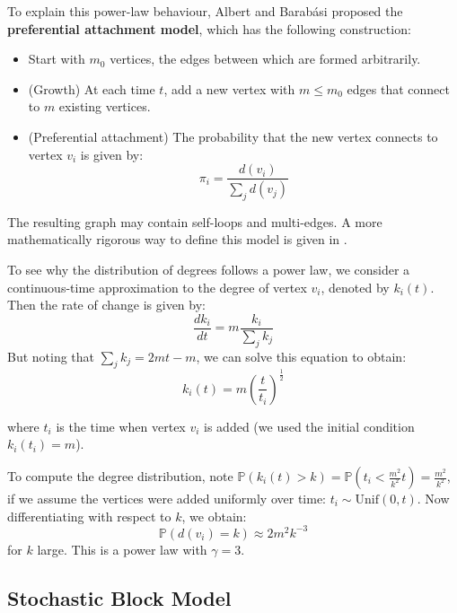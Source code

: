 \documentclass{article}
\begin{document}
To explain this power-law behaviour, Albert and Barab\'{a}si proposed the \textbf{preferential attachment model}, which has the following construction:
\begin{itemize}
    \item Start with $m_0$ vertices, the edges between which are formed arbitrarily.  
    \item (Growth) At each time $t$, add a new vertex with $m\leq m_0$ edges that connect to $m$ existing vertices.
    \item (Preferential attachment) The probability that the new vertex connects to vertex $v_i$ is given by:
    \begin{equation*}
        \pi_i = \frac{d(v_i)}{\sum_j d(v_j)}
    \end{equation*}
\end{itemize}

The resulting graph may contain self-loops and multi-edges. A more mathematically rigorous way to define this model is given in \citep{barabasi2016network}.  

\begin{unexaminable}
    To see why the distribution of degrees follows a power law, we consider a continuous-time approximation to the degree of vertex $v_i$, denoted by $k_i(t)$. Then the rate of change is given by:
    \begin{equation*}
        \frac{d k_i}{dt} = m \frac{k_i}{\sum_j k_j}
    \end{equation*}
    But noting that $\sum_j k_j = 2mt - m$, we can solve this equation  to obtain:
    \begin{equation*}
        k_i(t) = m \left( \frac{t}{t_i} \right)^{\frac{1}{2}}
    \end{equation*}

    where $t_i$ is the time when vertex $v_i$ is added (we used the initial condition $k_i(t_i)=m$).

    To compute the degree distribution, note $\mathbb{P}(k_i(t)>k) = \mathbb{P}(t_i < \frac{m^2}{k^2} t) = \frac{m^2}{k^2}$, if we assume the vertices were added uniformly over time: $t_i \sim \mathrm{Unif}(0,t)$. Now differentiating with respect to $k$, we obtain:
    \begin{equation*}
        \mathbb{P}(d(v_i)=k) \approx 2m^2 k^{-3}
    \end{equation*}
    for $k$ large. This is a power law with $\gamma=3$.
\end{unexaminable}

\subsection{Stochastic Block Model}
\end{document}
